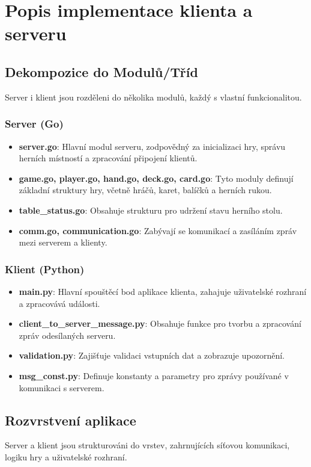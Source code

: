 \documentclass{article}
\begin{document}
\section{Popis implementace klienta a serveru}
\subsection{Dekompozice do Modulů/Tříd}
Server i klient jsou rozděleni do několika modulů, každý s vlastní funkcionalitou.

\subsubsection{Server (Go)}
\begin{itemize}
  \item \textbf{server.go}: Hlavní modul serveru, zodpovědný za inicializaci hry, správu herních místností a zpracování připojení klientů.
  \item \textbf{game.go, player.go, hand.go, deck.go, card.go}: Tyto moduly definují základní struktury hry, včetně hráčů, karet, balíčků a herních rukou.
  \item \textbf{table\_status.go}: Obsahuje strukturu pro udržení stavu herního stolu.
  \item \textbf{comm.go, communication.go}: Zabývají se komunikací a zasíláním zpráv mezi serverem a klienty.
\end{itemize}

\subsubsection{Klient (Python)}
\begin{itemize}
  \item \textbf{main.py}: Hlavní spouštěcí bod aplikace klienta, zahajuje uživatelské rozhraní a zpracovává události.
  \item \textbf{client\_to\_server\_message.py}: Obsahuje funkce pro tvorbu a zpracování zpráv odesílaných serveru.
  \item \textbf{validation.py}: Zajišťuje validaci vstupních dat a zobrazuje upozornění.
  \item \textbf{msg\_const.py}: Definuje konstanty a parametry pro zprávy používané v komunikaci s serverem.
\end{itemize}

\subsection{Rozvrstvení aplikace}
Server a klient jsou strukturováni do vrstev, zahrnujících síťovou komunikaci, logiku hry a uživatelské rozhraní.
\end{document}

